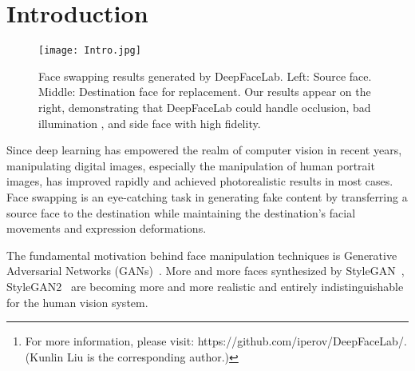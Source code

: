 \documentclass[10pt,twocolumn,letterpaper]{article}
\begin{document}
\begin{abstract}
Deepfake defense not only requires the research of detection but also requires the efforts of generation methods. However, current deepfake methods suffer the effects of obscure workflow and poor performance. To solve this problem, we present DeepFaceLab, the current dominant deepfake framework for face-swapping. It provides the necessary tools as well as an easy-to-use way to conduct high-quality face-swapping. It also offers a flexible and loose coupling structure for people who need to strengthen their pipeline with other features without writing complicated boilerplate code. We detail the principles that drive the implementation of DeepFaceLab and introduce its pipeline, through which every aspect of the pipeline can be modified painlessly by users to achieve their customization purpose. It is noteworthy that DeepFaceLab could achieve cinema-quality results with high fidelity.
We demonstrate the advantage of our system by comparing our approach with other face-swapping methods.\footnote{For more information, please visit: 	https://github.com/iperov/DeepFaceLab/. (Kunlin Liu is the corresponding author.)}
\end{abstract}

\section{Introduction}


\begin{figure*}[htpb]
	\begin{center}
		\texttt{[image: Intro.jpg]}
	\end{center}
	\caption{Face swapping results generated by DeepFaceLab. Left: Source face. Middle: Destination face for replacement. Our results appear on the right, demonstrating that DeepFaceLab could handle occlusion, bad illumination , and side face with high fidelity. 
}
	\label{fig:long1}
	\label{fig:onecol1}
\end{figure*}
Since deep learning has empowered the realm of computer vision in recent years, manipulating digital images, especially the manipulation of human portrait images, has improved rapidly and achieved photorealistic results in most cases. Face swapping is an eye-catching task in generating fake content by transferring a source face to the destination while maintaining the destination's facial movements and expression deformations. 

The fundamental motivation behind face manipulation techniques is Generative Adversarial Networks (GANs)~\cite{goodfellow2014generative}. More and more faces synthesized by StyleGAN~\cite{karras2019style}, StyleGAN2~\cite{karras2019analyzing} are becoming more and more realistic and entirely indistinguishable for the human vision system. 
\end{document}

